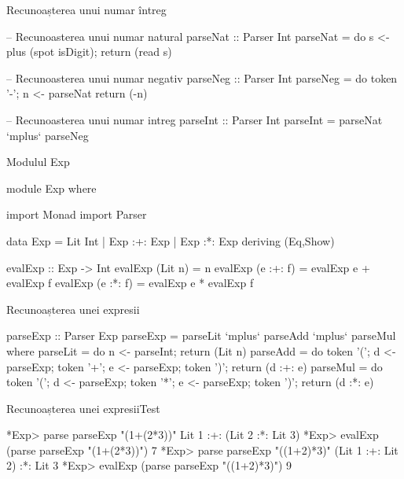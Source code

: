 \documentclass[xcolor=pdftex,romanian,colorlinks]{beamer}
\begin{document}

\begin{frame}[fragile]{Recunoașterea unui numar întreg}
\begin{asciihs}
  -- Recunoasterea unui numar natural
  parseNat :: Parser Int
  parseNat = do { s <- plus (spot isDigit);
                  return (read s) }

  -- Recunoasterea unui numar negativ
  parseNeg :: Parser Int
  parseNeg = do { token '-';
                  n <- parseNat
                  return (-n) }

  -- Recunoasterea unui numar intreg
  parseInt :: Parser Int
  parseInt = parseNat `mplus` parseNeg
\end{asciihs}
\end{frame}



\begin{frame}[fragile]{Modulul Exp}
\begin{asciihs}
  module Exp where

  import Monad
  import Parser

  data Exp = Lit Int
           | Exp :+: Exp
           | Exp :*: Exp
           deriving (Eq,Show)

  evalExp   :: Exp -> Int
  evalExp   (Lit n)    = n
  evalExp   (e :+: f) = evalExp e + evalExp f
  evalExp   (e :*: f) = evalExp e * evalExp f
\end{asciihs}
\end{frame}




\begin{frame}[fragile]{Recunoașterea unei expresii}
\begin{asciihs}
  parseExp :: Parser Exp
  parseExp = parseLit `mplus` parseAdd `mplus` parseMul
    where
    parseLit = do { n <- parseInt;
                    return (Lit n) }
    parseAdd = do { token '(';
                    d <- parseExp;
                    token '+';
                    e <- parseExp;
                    token ')';
                    return (d :+: e) }
    parseMul = do { token '(';
                    d <- parseExp;
                    token '*';
                    e <- parseExp;
                    token ')';
                    return (d :*: e) }
\end{asciihs}
\end{frame}



\begin{frame}[fragile]{Recunoașterea unei expresii}{Test}
\begin{asciihs}
  *Exp> parse parseExp "(1+(2*3))"
  Lit 1 :+: (Lit 2 :*: Lit 3)
  *Exp> evalExp (parse parseExp "(1+(2*3))")
  7
  *Exp> parse parseExp "((1+2)*3)"
  (Lit 1 :+: Lit 2) :*: Lit 3
  *Exp> evalExp (parse parseExp "((1+2)*3)")
  9
\end{asciihs}
\end{frame}
\end{document}
